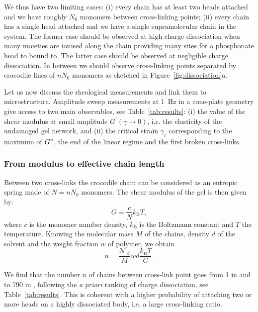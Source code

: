 \documentclass[journal=jacsat,manuscript=article]{achemso}
\begin{document}
We thus have two limiting cases: (i) every chain has at least two heads attached and we have roughly $N_0$ monomers between cross-linking points; (ii) every chain has a single head attached and we have a single supramolecular chain in the system. The former case should be observed at high charge dissociation when many moieties are ionised along the chain providing many sites for a phosphonate head to bound to. The latter case should be observed at negligible charge dissociation. In between we should observe cross-linking points separated by crocodile lines of $n N_0$ monomers as sketched in Figure~\ref{fig:dissociation}a.

Let us now discuss the rheological measurements and link them to microstructure. Amplitude sweep measurements at \SI{1}{\hertz} in a cone-plate geometry give access to two main observables, see Table~\ref{tab:results}: (i) the value of the shear modulus at small amplitude $G^\prime(\gamma\rightarrow 0)$, i.e. the elasticity of the undamaged gel network, and (ii) the critical strain $\gamma_c$ corresponding to the maximum of $G"$, the end of the linear regime and the first broken cross-links.


\subsubsection{From modulus to effective chain length}

Between two cross-links the crocodile chain can be considered as an entropic spring made of $N=n N_0$ monomers. The shear modulus of the gel is then given by:
\begin{equation}
G = \frac{c}{N}k_\mathrm{B}T,
\label{eq:G}
\end{equation}
where $c$ is the monomer number density, $k_\mathrm{B}$ is the Boltzmann constant and $T$ the temperature. Knowing the molecular mass $M$ of the chains, density $d$ of the solvent and the weight fraction $w$ of polymer, we obtain
\begin{equation}
n = \frac{\mathcal{N_A}}{M} w d \frac{k_\mathrm{B}T}{G}.
\end{equation}

We find that the number $n$ of chains between cross-link point goes from 1 in  and  to 790 in , following the \textit{a priori} ranking of charge dissociation, see Table~\ref{tab:results}. This is coherent with a higher probability of attaching two or more heads on a highly dissociated body, i.e. a large cross-linking ratio.
\end{document}
